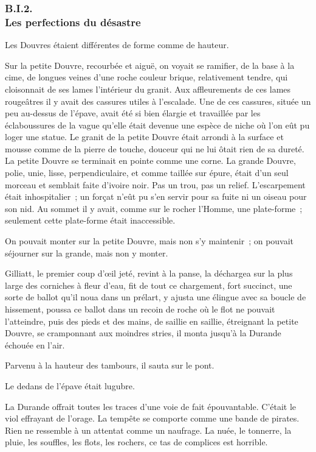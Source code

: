 \documentclass[french,twoside]{book} %
\begin{document}
 \subsubsection[{B.I.2. Les perfections du désastre}]{B.I.2. \\
Les perfections du désastre}
\noindent Les Douvres étaient différentes de forme comme de hauteur.\par
Sur la petite Douvre, recourbée et aiguë, on voyait se ramifier, de la base à la cime, de longues veines d’une roche couleur brique, relativement tendre, qui cloisonnait de ses lames l’intérieur du granit. Aux affleurements de ces lames rougeâtres il y avait des cassures utiles à l’escalade. Une de ces cassures, située un peu au-dessus de l’épave, avait été si bien élargie et travaillée par les éclaboussures de la vague qu’elle était devenue une espèce de niche où l’on eût pu loger une statue. Le granit de la petite Douvre était arrondi à la surface et mousse comme de la pierre de touche, douceur qui ne lui ôtait rien de sa dureté. La petite Douvre se terminait en pointe comme une  corne. La grande Douvre, polie, unie, lisse, perpendiculaire, et comme taillée sur épure, était d’un seul morceau et semblait faite d’ivoire noir. Pas un trou, pas un relief. L’escarpement était inhospitalier ; un forçat n’eût pu s’en servir pour sa fuite ni un oiseau pour son nid. Au sommet il y avait, comme sur le rocher l’Homme, une plate-forme ; seulement cette plate-forme était inaccessible.\par
On pouvait monter sur la petite Douvre, mais non s’y maintenir ; on pouvait séjourner sur la grande, mais non y monter.\par
Gilliatt, le premier coup d’œil jeté, revint à la panse, la déchargea sur la plus large des corniches à fleur d’eau, fit de tout ce chargement, fort succinct, une sorte de ballot qu’il noua dans un prélart, y ajusta une élingue avec sa boucle de hissement, poussa ce ballot dans un recoin de roche où le flot ne pouvait l’atteindre, puis des pieds et des mains, de saillie en saillie, étreignant la petite Douvre, se cramponnant aux moindres stries, il monta jusqu’à la Durande échouée en l’air.\par
Parvenu à la hauteur des tambours, il sauta sur le pont.\par
Le dedans de l’épave était lugubre.\par
La Durande offrait toutes les traces d’une voie de fait épouvantable. C’était le viol effrayant de l’orage. La tempête se comporte comme une bande de pirates. Rien ne ressemble à un attentat comme un naufrage. La nuée, le tonnerre, la pluie, les souffles, les flots, les rochers, ce tas de complices est horrible.\par
\end{document}
